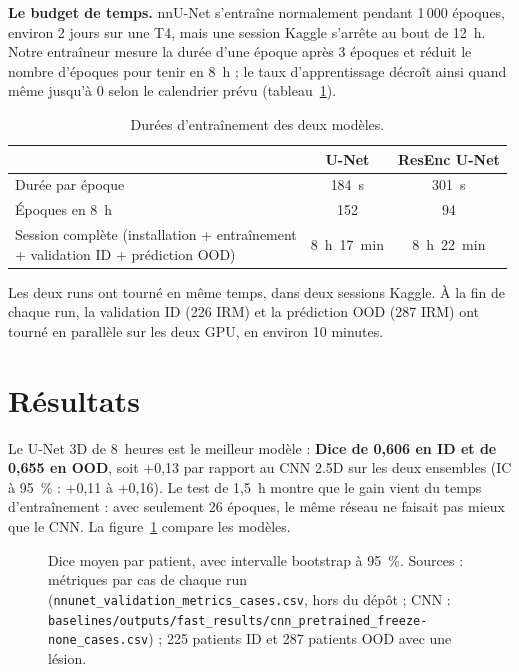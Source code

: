 \textbf{Le budget de temps.} nnU-Net s'entraîne normalement pendant 1\,000 époques, environ 2 jours sur une T4, mais une session Kaggle s'arrête au bout de 12~h.
Notre entraîneur mesure la durée d'une époque après 3 époques et réduit le nombre d'époques pour tenir en 8~h ; le taux d'apprentissage décroît ainsi quand même jusqu'à 0 selon le calendrier prévu (tableau~\ref{tab:anas-durees}).

\begin{table}[htbp]
  \centering
  \caption{Durées d'entraînement des deux modèles.}
  \label{tab:anas-durees}
  \small
  \begin{tabular}{lcc}
    \toprule
    & U-Net & ResEnc U-Net \\
    \midrule
    Durée par époque & 184~s & 301~s \\
    Époques en 8~h & 152 & 94 \\
    \makecell[l]{Session complète (installation + entraînement\\+ validation ID + prédiction OOD)} & 8~h~17~min & 8~h~22~min \\
    \bottomrule
  \end{tabular}
\end{table}

Les deux runs ont tourné en même temps, dans deux sessions Kaggle.
À la fin de chaque run, la validation ID (226 IRM) et la prédiction OOD (287 IRM) ont tourné en parallèle sur les deux GPU, en environ 10 minutes.

\section{Résultats}
\label{sec:anas-resultats}

Le U-Net 3D de 8~heures est le meilleur modèle : \textbf{Dice de 0,606 en ID et de 0,655 en OOD}, soit +0,13 par rapport au CNN 2.5D sur les deux ensembles (IC à 95~\% : +0,11 à +0,16).
Le test de 1,5~h montre que le gain vient du temps d'entraînement : avec seulement 26 époques, le même réseau ne faisait pas mieux que le CNN.
La figure~\ref{fig:anas-dice} compare les modèles.

\begin{figure}[htbp]
  \centering
  \caption{Dice moyen par patient, avec intervalle bootstrap à 95~\%. Sources : métriques par cas de chaque run (\texttt{nnunet\_validation\_metrics\_cases.csv}, hors du dépôt ; CNN : \nolinkurl{baselines/outputs/fast_results/cnn_pretrained_freeze-none_cases.csv}) ; 225 patients ID et 287 patients OOD avec une lésion.}
  \label{fig:anas-dice}
\end{figure}

